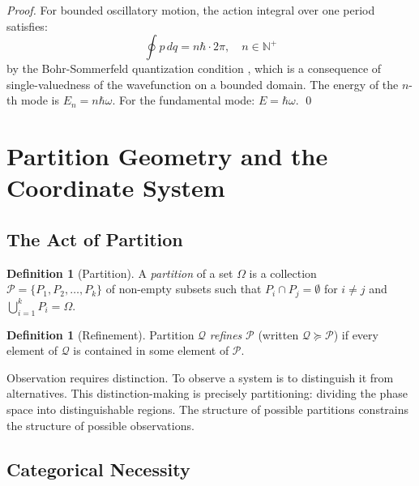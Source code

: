 \documentclass[twocolumn,10pt,a4paper]{article}
\theoremstyle{definition}
\newtheorem{definition}[theorem]{Definition}
\theoremstyle{remark}
\newcommand{\Partition}{\mathcal{P}}
\newcommand{\Natural}{\mathbb{N}}
\begin{document}
\begin{proof}
For bounded oscillatory motion, the action integral over one period satisfies:
\begin{equation}
    \oint p \, dq = n\hbar \cdot 2\pi, \quad n \in \Natural^+
\end{equation}
by the Bohr-Sommerfeld quantization condition \citep{bohr1913,landau1977}, which is a consequence of single-valuedness of the wavefunction on a bounded domain. The energy of the $n$-th mode is $E_n = n\hbar\omega$. For the fundamental mode: $E = \hbar\omega$. \qed
\end{proof}

\section{Partition Geometry and the Coordinate System}
\label{sec:partition}

\subsection{The Act of Partition}

\begin{definition}[Partition]
\label{def:partition}
A \emph{partition} of a set $\Omega$ is a collection $\Partition = \{P_1, P_2, \ldots, P_k\}$ of non-empty subsets such that $P_i \cap P_j = \emptyset$ for $i \neq j$ and $\bigcup_{i=1}^{k} P_i = \Omega$.
\end{definition}

\begin{definition}[Refinement]
\label{def:refinement}
Partition $\mathcal{Q}$ \emph{refines} $\Partition$ (written $\mathcal{Q} \succeq \Partition$) if every element of $\mathcal{Q}$ is contained in some element of $\Partition$.
\end{definition}

Observation requires distinction. To observe a system is to distinguish it from alternatives. This distinction-making is precisely partitioning: dividing the phase space into distinguishable regions. The structure of possible partitions constrains the structure of possible observations.

\subsection{Categorical Necessity}
\end{document}
